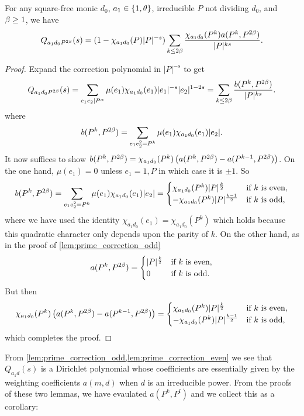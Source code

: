 \documentclass[12pt,reqno,oneside]{amsart}
\begin{document}
    \begin{lemma}\label{lem:prime_correction_even}
        For any square-free monic $d_{0}$, $a_{1} \in \{1,\theta\}$, irreducible $P$ not dividing $d_{0}$, and $\beta \ge 1$, we have
        \[
            Q_{a_{1}d_{0}P^{2\beta}}(s) = (1-\chi_{a_{1}d_{0}}(P)|P|^{-s})\sum_{k \le 2\beta}\frac{\chi_{a_{1}d_{0}}(P^{k})a(P^{k},P^{2\beta})}{|P|^{ks}}.
        \]
    \end{lemma}
    \begin{proof}
        Expand the correction polynomial in $|P|^{-s}$ to get
        \[
            Q_{a_{1}d_{0}P^{2\beta}}(s) = \sum_{e_{1}e_{2} \mid P^{\alpha}}\mu(e_{1})\chi_{a_{1}d_{0}}(e_{1})|e_{1}|^{-s}|e_{2}|^{1-2s} = \sum_{k \le 2\beta}\frac{b(P^{k},P^{2\beta})}{|P|^{ks}}.
        \]
        where
        \[
            b(P^{k},P^{2\beta}) = \sum_{e_{1}e_{2}^{2} = P^{k}}\mu(e_{1})\chi_{a_{1}d_{0}}(e_{1})|e_{2}|.
        \]
        It now suffices to show $b(P^{k},P^{2\beta}) = \chi_{a_{1}d_{0}}(P^{k})\left(a(P^{k},P^{2\beta})-a(P^{k-1},P^{2\beta})\right)$. On the one hand, $\mu(e_{1}) = 0$ unless $e_{1} = 1,P$ in which case it is $\pm1$. So
        \[
            b(P^{k},P^{2\beta}) = \sum_{e_{1}e_{2}^{2} = P^{k}}\mu(e_{1})\chi_{a_{1}d_{0}}(e_{1})|e_{2}| = \begin{cases} \chi_{a_{1}d_{0}}(P^{k})|P|^{\frac{k}{2}} & \text{if $k$ is even}, \\ -\chi_{a_{1}d_{0}}(P^{k})|P|^{\frac{k-1}{2}} & \text{if $k$ is odd}, \end{cases}
        \]
        where we have used the identity $\chi_{a_{1}d_{0}}(e_{1}) = \chi_{a_{1}d_{0}}(P^{k})$ which holds because this quadratic character only depends upon the parity of $k$. On the other hand, as in the proof of \cref{lem:prime_correction_odd} 
        \[
            a(P^{k},P^{2\beta}) = \begin{cases} |P|^{\frac{k}{2}} & \text{if $k$ is even}, \\ 0 & \text{if $k$ is odd}. \end{cases}
        \]
        But then
        \[
            \chi_{a_{1}d_{0}}(P^{k})\left(a(P^{k},P^{2\beta})-a(P^{k-1},P^{2\beta})\right) = \begin{cases} \chi_{a_{1}d_{0}}(P^{k})|P|^{\frac{k}{2}} & \text{if $k$ is even}, \\ -\chi_{a_{1}d_{0}}(P^{k})|P|^{\frac{k-1}{2}} & \text{if $k$ is odd}, \end{cases}
        \]
        which completes the proof.
    \end{proof}

    From \cref{lem:prime_correction_odd,lem:prime_correction_even} we see that $Q_{a_{1}d}(s)$ is a Dirichlet polynomial whose coefficients are essentially given by the weighting coefficients $a(m,d)$ when $d$ is an irreducible power. From the proofs of these two lemmas, we have evaulated $a(P^{k},P^{l})$ and we collect this as a corollary:
\end{document}

